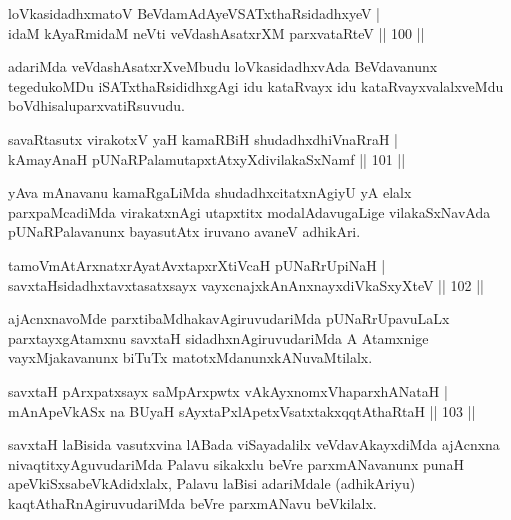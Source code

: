 \begin{shl}
loVkasidadhxmatoV BeVdamAdAyeVSATxthaRsidadhxyeV  | \\
idaM kAyaRmidaM neVti veVdashAsatxrXM parxvataRteV \hfill||  100 ||  
\end{shl}

\begin{artha}
adariMda veVdashAsatxrXveMbudu loVkasidadhxvAda BeVdavanunx tegedukoMDu iSATxthaRsididhxgAgi idu kataRvayx idu kataRvayxvalalxveMdu boVdhisalu\break parxvatiRsuvudu.
\end{artha}

\begin{shl}
savaRtasutx virakotxV yaH kamaRBiH shudadhxdhiVnaRraH  | \\
kAmayAnaH pUNaRPalamutapxtAtxyXdivilakaSxNamf \hfill||  101 ||  
\end{shl}

\begin{artha}
yAva mAnavanu kamaRgaLiMda shudadhxcitatxnAgiyU yA elalx parxpaMcadiMda virakatxnAgi utapxtitx modalAdavugaLige vilakaSxNavAda pUNaRPalavanunx bayasutAtx iruvano avaneV adhikAri.
\end{artha}

\begin{shl}
tamoVmAtArxnatxrAyatAvxtapxrXtiVcaH pUNaRrUpiNaH  | \\
savxtaHsidadhxtavxtasatxsayx vayxcnajxkAnAnxnayxdiVkaSxyXteV \hfill||  102 ||  
\end{shl}

\begin{artha}
ajAcnxnavoMde parxtibaMdhakavAgiruvudariMda pUNaRrUpavuLaLx parxtayxgAtamxnu savxtaH sidadhxnAgiruvudariMda A Atamxnige vayxMjakavanunx biTuTx matotxMdanunx\break kANuvaMtilalx.
\end{artha}

\begin{shl}
savxtaH pArxpatxsayx saMpArxpwtx vAkAyxnomxVhaparxhANataH  | \\
mAnApeVkASx na BUyaH sAyxtaPxlApetxVsatxtakxqqtAthaRtaH \hfill||  103 ||  
\end{shl}

\begin{artha}
savxtaH laBisida vasutxvina lABada viSayadalilx veVdavAkayxdiMda ajAcnxna nivaqtitxyAguvudariMda Palavu sikakxlu beVre parxmANavanunx punaH apeVkiSxsabeVkAdidxlalx, Palavu laBisi adariMdale (adhikAriyu) kaqtAthaRnAgiruvudariMda beVre parxmANavu beVkilalx.
\end{artha}

